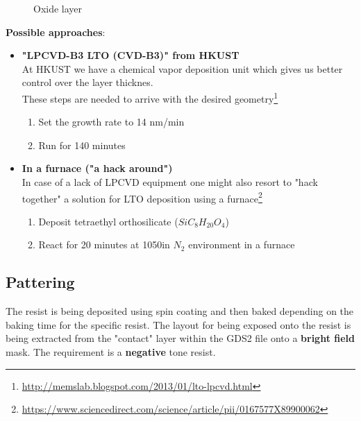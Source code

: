 \begin{figure}[H]
	\centering
	\begin{tikzpicture}[node distance = 3cm, auto, thick,scale=\CrossSectionOnly, every node/.style={transform shape}]
		
	\end{tikzpicture}
	\begin{tikzpicture}[node distance = 3cm, auto, thick,scale=\CrossSectionOnly, every node/.style={transform shape}]
		
	\end{tikzpicture}
	\caption{Oxide layer}
\end{figure}

\textbf{Possible approaches}:
\begin{itemize}
	\item \textbf{"LPCVD-B3 LTO (CVD-B3)" from HKUST} \\
	At HKUST we have a chemical vapor deposition unit which gives us better control over the layer thicknes. \\
	These steps are needed to arrive with the desired geometry\footnote{\url{http://memslab.blogspot.com/2013/01/lto-lpcvd.html}}
	\begin{enumerate}
		\item Set the growth rate to 14 nm/min
		\item Run for 140 minutes
	\end{enumerate}
	\item \textbf{In a furnace ("a hack around")} \\
	In case of a lack of LPCVD equipment one might also resort to "hack together" a solution for LTO deposition using a furnace\footnote{\url{https://www.sciencedirect.com/science/article/pii/0167577X89900062}}
		\begin{enumerate}
			\item Deposit tetraethyl orthosilicate ($Si C_8 H_{20} O_4$)
			\item React for 20 minutes at 1050\degreesC in $N_2$ environment in a furnace
	\end{enumerate}
\end{itemize}

\subsection{Pattering}

The resist is being deposited using spin coating and then baked depending on the baking time for the specific resist.
The layout for being exposed onto the resist is being extracted from the "contact" layer within the GDS2 file onto a \textbf{bright field} mask.
The requirement is a \textbf{negative} tone resist.

